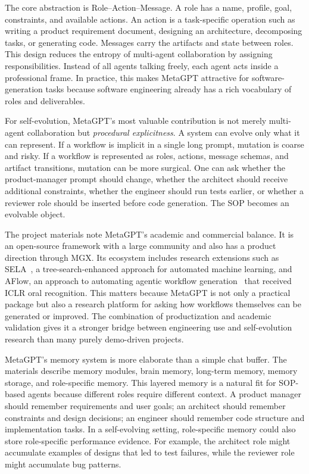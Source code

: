 The core abstraction is Role--Action--Message.  A role has a name, profile, goal, constraints, and available actions.  An action is a task-specific operation such as writing a product requirement document, designing an architecture, decomposing tasks, or generating code.  Messages carry the artifacts and state between roles.  This design reduces the entropy of multi-agent collaboration by assigning responsibilities.  Instead of all agents talking freely, each agent acts inside a professional frame.  In practice, this makes MetaGPT attractive for software-generation tasks because software engineering already has a rich vocabulary of roles and deliverables.

For self-evolution, MetaGPT's most valuable contribution is not merely multi-agent collaboration but \emph{procedural explicitness}.  A system can evolve only what it can represent.  If a workflow is implicit in a single long prompt, mutation is coarse and risky.  If a workflow is represented as roles, actions, message schemas, and artifact transitions, mutation can be more surgical.  One can ask whether the product-manager prompt should change, whether the architect should receive additional constraints, whether the engineer should run tests earlier, or whether a reviewer role should be inserted before code generation.  The SOP becomes an evolvable object.

The project materials note MetaGPT's academic and commercial balance.  It is an open-source framework with a large community and also has a product direction through MGX.  Its ecosystem includes research extensions such as SELA~\cite{adas2025}, a tree-search-enhanced approach for automated machine learning, and AFlow, an approach to automating agentic workflow generation~\cite{adas2025} that received ICLR oral recognition.  This matters because MetaGPT is not only a practical package but also a research platform for asking how workflows themselves can be generated or improved.  The combination of productization and academic validation gives it a stronger bridge between engineering use and self-evolution research than many purely demo-driven projects.

MetaGPT's memory system is more elaborate than a simple chat buffer.  The materials describe memory modules, brain memory, long-term memory, memory storage, and role-specific memory.  This layered memory is a natural fit for SOP-based agents because different roles require different context.  A product manager should remember requirements and user goals; an architect should remember constraints and design decisions; an engineer should remember code structure and implementation tasks.  In a self-evolving setting, role-specific memory could also store role-specific performance evidence.  For example, the architect role might accumulate examples of designs that led to test failures, while the reviewer role might accumulate bug patterns.

